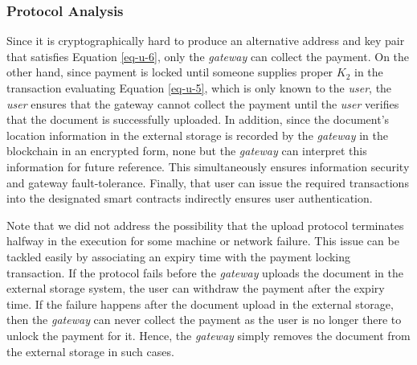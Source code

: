 \subsubsection*{Protocol Analysis}
Since it is cryptographically hard to produce an alternative address and key pair that satisfies Equation \ref{eq-u-6}, only the {\it gateway} can collect the payment. On the other hand, since payment is locked until someone supplies proper $K_2$ in the transaction evaluating Equation \ref{eq-u-5}, which is only known to the {\it user}, the {\it user} ensures that the gateway cannot collect the payment until the {\it user} verifies that the document is successfully uploaded. In addition, since the document's location information in the external storage is recorded by the {\it gateway} in the blockchain in an encrypted form, none but the {\it gateway} can interpret this information for future reference. This simultaneously ensures information security and gateway fault-tolerance. Finally, that user can issue the required transactions into the designated smart contracts indirectly ensures user authentication. 

Note that we did not address the possibility that the upload protocol terminates halfway in the execution for some machine or network failure. This issue can be tackled easily by associating an expiry time with the payment locking transaction. If the protocol fails before the {\it gateway} uploads the document in the external storage system, the user can withdraw the payment after the expiry time. If the failure happens after the document upload in the external storage, then the {\it gateway} can never collect the payment as the user is no longer there to unlock the payment for it. Hence, the {\it gateway} simply removes the document from the external storage in such cases.      

